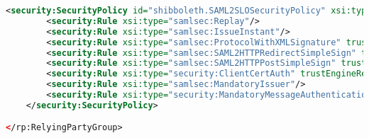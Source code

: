 \begin{lstlisting}[language=xml]
    <security:SecurityPolicy id="shibboleth.SAML2SLOSecurityPolicy" xsi:type="security:SecurityPolicyType">
        <security:Rule xsi:type="samlsec:Replay"/>
        <security:Rule xsi:type="samlsec:IssueInstant"/>
        <security:Rule xsi:type="samlsec:ProtocolWithXMLSignature" trustEngineRef="shibboleth.SignatureTrustEngine"/>
        <security:Rule xsi:type="samlsec:SAML2HTTPRedirectSimpleSign" trustEngineRef="shibboleth.SignatureTrustEngine"/>
        <security:Rule xsi:type="samlsec:SAML2HTTPPostSimpleSign" trustEngineRef="shibboleth.SignatureTrustEngine"/>
        <security:Rule xsi:type="security:ClientCertAuth" trustEngineRef="shibboleth.CredentialTrustEngine"/>
        <security:Rule xsi:type="samlsec:MandatoryIssuer"/>
        <security:Rule xsi:type="security:MandatoryMessageAuthentication"/>
    </security:SecurityPolicy>

</rp:RelyingPartyGroup>
\end{lstlisting}

